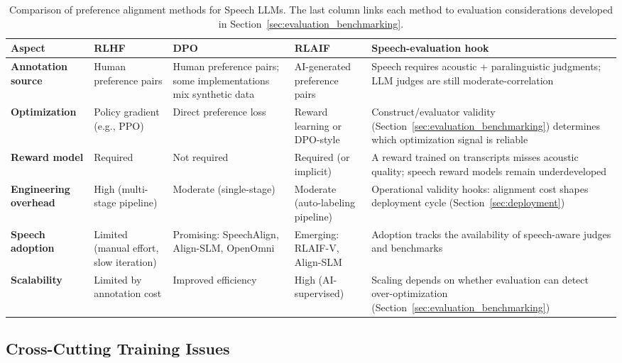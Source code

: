 \begin{table}[t]
\caption{Comparison of preference alignment methods for Speech LLMs. The
last column links each method to evaluation considerations developed in
Section~\ref{sec:evaluation_benchmarking}.}
\label{tab:alignment_comparison}
\centering
\scriptsize
\begin{tabularx}{\linewidth}{lXXXX}
\toprule
\textbf{Aspect} & \textbf{RLHF} & \textbf{DPO} & \textbf{RLAIF} & \textbf{Speech-evaluation hook} \\
\midrule
\textbf{Annotation source} & Human preference pairs & Human preference pairs; some implementations mix synthetic data & AI-generated preference pairs & Speech requires acoustic + paralinguistic judgments; LLM judges are still moderate-correlation \citep{zheng2023judging} \\
\midrule
\textbf{Optimization} & Policy gradient (e.g., PPO) & Direct preference loss & Reward learning or DPO-style & Construct/evaluator validity (Section~\ref{sec:evaluation_benchmarking}) determines which optimization signal is reliable \\
\midrule
\textbf{Reward model} & Required & Not required & Required (or implicit) & A reward trained on transcripts misses acoustic quality; speech reward models remain underdeveloped \\
\midrule
\textbf{Engineering overhead} & High (multi-stage pipeline) & Moderate (single-stage) & Moderate (auto-labeling pipeline) & Operational validity hooks: alignment cost shapes deployment cycle (Section~\ref{sec:deployment}) \\
\midrule
\textbf{Speech adoption} & Limited (manual effort, slow iteration) & Promising: SpeechAlign, Align-SLM, OpenOmni & Emerging: RLAIF-V, Align-SLM & Adoption tracks the availability of speech-aware judges and benchmarks \\
\midrule
\textbf{Scalability} & Limited by annotation cost & Improved efficiency & High (AI-supervised) & Scaling depends on whether evaluation can detect over-optimization (Section~\ref{sec:evaluation_benchmarking}) \\
\bottomrule
\end{tabularx}
\end{table}

\subsection{Cross-Cutting Training Issues}
\label{subsec:training_crosscutting}

